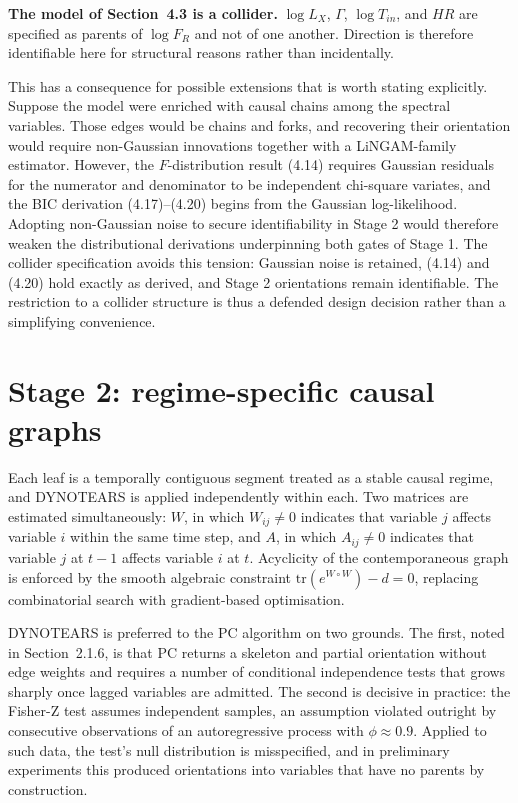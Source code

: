 \textbf{The model of Section~4.3 is a collider.} $\log L_X$, $\Gamma$, $\log T_{in}$, and $HR$ are
specified as parents of $\log F_R$ and not of one another. Direction is therefore
identifiable here for structural reasons rather than incidentally.

This has a consequence for possible extensions that is worth stating explicitly.
Suppose the model were enriched with causal chains among the spectral variables. Those
edges would be chains and forks, and recovering their orientation would require
non-Gaussian innovations together with a LiNGAM-family estimator. However, the
$F$-distribution result (4.14) requires Gaussian residuals for the numerator and
denominator to be independent chi-square variates, and the BIC derivation (4.17)--(4.20)
begins from the Gaussian log-likelihood. Adopting non-Gaussian noise to secure
identifiability in Stage 2 would therefore weaken the distributional derivations
underpinning both gates of Stage 1. The collider specification avoids this tension:
Gaussian noise is retained, (4.14) and (4.20) hold exactly as derived, and Stage 2
orientations remain identifiable. The restriction to a collider structure is thus a
defended design decision rather than a simplifying convenience.


\section{Stage 2: regime-specific causal graphs}

Each leaf is a temporally contiguous segment treated as a stable causal regime, and
DYNOTEARS is applied independently within each. Two matrices are estimated
simultaneously: $W$, in which $W_{ij} \neq 0$ indicates that variable $j$ affects
variable $i$ within the same time step, and $A$, in which $A_{ij} \neq 0$ indicates
that variable $j$ at $t-1$ affects variable $i$ at $t$. Acyclicity of the
contemporaneous graph is enforced by the smooth algebraic constraint
$\mathrm{tr}(e^{W \circ W}) - d = 0$, replacing combinatorial search with
gradient-based optimisation.

DYNOTEARS is preferred to the PC algorithm on two grounds. The first, noted in Section~2.1.6,
is that PC returns a skeleton and partial orientation without edge weights and
requires a number of conditional independence tests that grows sharply once lagged
variables are admitted. The second is decisive in practice: the Fisher-Z test assumes
independent samples, an assumption violated outright by consecutive observations of an
autoregressive process with $\phi \approx 0.9$. Applied to such data, the test's null
distribution is misspecified, and in preliminary experiments this produced orientations
into variables that have no parents by construction.

